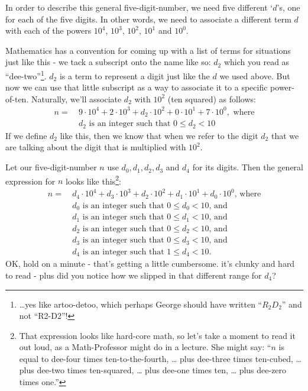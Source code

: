 \documentclass{article}
\begin{document}
In order to describe this general five-digit-number, we need
five different `$d$'s, one for each of the five digits.
In other words, we need to associate a different term $d$ with each of the powers
$10^4$, $10^3$, $10^2$, $10^1$ and $10^0$.

Mathematics has a convention for coming up with
a list of terms for situations just like this -
we tack a subscript onto the name like so: $d_2$ which
you read as ``dee-two''\footnote{\dots{}yes like artoo-detoo, which perhaps
George should have written ``$R_2D_2$'' and not ``R2-D2''!}.
$d_2$ is a term to represent a digit just like the $d$ we used above.
But now we can use that little subscript as a way to
associate it to a specific power-of-ten.
Naturally, we'll associate $d_2$ with $10^2$ (ten squared) as follows:
\begin{align*}
n =\ &9{\cdot}10^4+2{\cdot}10^3+d_2{\cdot}10^2+0{\cdot}10^1+7{\cdot}10^0,\text{ where}\\
&d_2\text{ is an integer such that }0\le{}d_2<10
\end{align*}
If we define $d_2$ like this, then we know that when we refer to the digit $d_2$
that we are talking about the digit that is multiplied with $10^2$.

Let our five-digit-number $n$ use $d_0,d_1,d_2,d_3$ and $d_4$ for its digits. Then
the general expression for $n$ looks like this\footnote{That expression looks like
hard-core math, so let's take a moment
to read it out loud, as a Math-Professor might do in a lecture.  She might say:
``$n$ is equal to dee-four times ten-to-the-fourth, \dots{}
plus dee-three times ten-cubed, \dots{} plus dee-two times ten-squared,
  \dots{} plus dee-one times ten,  \dots{} plus dee-zero times one.''}:
\begin{align*}
n =\ &d_4{\cdot}10^4+d_3{\cdot}10^3+d_2{\cdot}10^2+d_1{\cdot}10^1+d_0{\cdot}10^0\text{, where}\\
& d_0\text{ is an integer such that }0\le{}d_0<10\text{, and}\\
& d_1\text{ is an integer such that }0\le{}d_1<10\text{, and}\\
& d_2\text{ is an integer such that }0\le{}d_2<10\text{, and}\\
& d_3\text{ is an integer such that }0\le{}d_3<10\text{, and}\\
& d_4\text{ is an integer such that }1\le{}d_4<10.
\end{align*}
OK, hold on a minute - that's getting a little cumbersome. it's clunky and hard to read -
plus did  you notice how we slipped in that different range for $d_4$?
\end{document}
